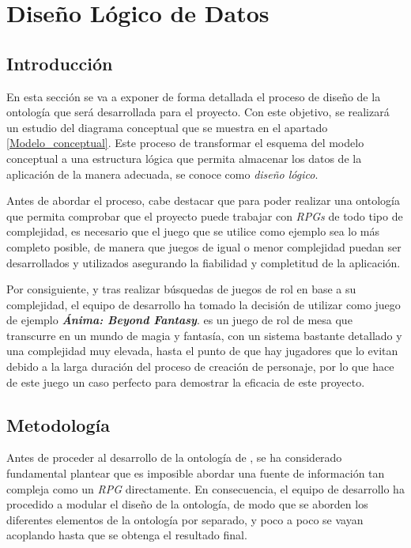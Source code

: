 
\section{Diseño Lógico de Datos}
\subsection{Introducción}
En esta sección se va a exponer de forma detallada el proceso de diseño de la ontología que será desarrollada 
para el proyecto. Con este objetivo, se realizará un estudio del diagrama conceptual 
que se muestra en el apartado \ref{Modelo_conceptual}. Este proceso de transformar el esquema del 
modelo conceptual a una estructura lógica que permita almacenar los datos de la aplicación de la 
manera adecuada, se conoce como \textit{diseño lógico}. \medskip

Antes de abordar el proceso, cabe destacar que para poder realizar una ontología que permita comprobar 
que el proyecto puede trabajar con \textit{RPGs} de todo tipo de complejidad, es necesario que el 
juego que se utilice como ejemplo sea lo más completo posible, de manera que juegos de igual o menor   
complejidad puedan ser desarrollados y utilizados asegurando la fiabilidad y completitud de la aplicación. \medskip

Por consiguiente, y tras realizar búsquedas de juegos de rol en base a su complejidad, el equipo de 
desarrollo ha tomado la decisión de utilizar como juego de ejemplo \textit{\textbf{Ánima: Beyond Fantasy}}.
\anima es un juego de rol de mesa que transcurre en un mundo de magia y fantasía, con un sistema
bastante detallado y una complejidad muy elevada, hasta el punto de que hay jugadores que lo evitan 
debido a la larga duración del proceso de creación de personaje, por lo que hace de este juego un caso 
perfecto para demostrar la eficacia de este proyecto.

\subsection{Metodología}
Antes de proceder al desarrollo de la ontología de \anima, se ha considerado fundamental plantear 
que es imposible abordar una fuente de información tan compleja como un \textit{RPG} directamente. En consecuencia, 
el equipo de desarrollo ha procedido a modular el diseño de la ontología, de modo que se aborden los diferentes 
elementos de la ontología por separado, y poco a poco se vayan acoplando hasta que se obtenga el resultado final. \medskip

